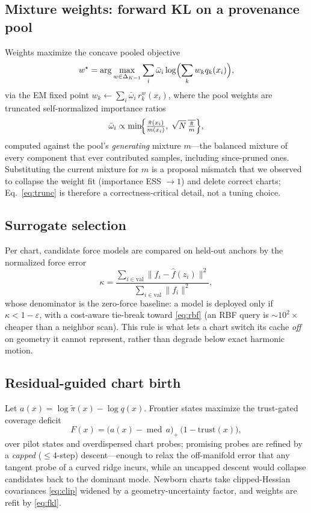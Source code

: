 \documentclass[10pt,journal,compsoc]{IEEEtran}
\begin{document}
\subsection{Mixture weights: forward KL on a provenance pool}
Weights maximize the concave pooled objective
\begin{equation}
w^\star=\arg\max_{w\in\Delta_{K-1}}
\sum_i\bar\omega_i\log\Bigl(\sum_k w_k q_k(x_i)\Bigr),
\label{eq:fkl}
\end{equation}
via the EM fixed point
$w_k\!\leftarrow\!\sum_i\bar\omega_i\,r_k^{w}(x_i)$, where the pool weights
are truncated self-normalized importance ratios \cite{ionides2008}
\begin{equation}
\bar\omega_i\propto
\min\!\Bigl\{\tfrac{\tilde\pi(x_i)}{m(x_i)},\;
\sqrt N\,\overline{\tfrac{\tilde\pi}{m}}\Bigr\},
\label{eq:trunc}
\end{equation}
computed against the pool's \emph{generating} mixture $m$---the balanced
mixture of every component that ever contributed samples, including
since-pruned ones. Substituting the current mixture for $m$ is a proposal
mismatch that we observed to collapse the weight fit (importance ESS
$\to1$) and delete correct charts; Eq.~\eqref{eq:trunc} is therefore a
correctness-critical detail, not a tuning choice.

\subsection{Surrogate selection}
Per chart, candidate force models are compared on held-out anchors by the
normalized force error
\begin{equation}
\kappa=\frac{\sum_{i\in\mathrm{val}}\lVert f_i-\hat f(z_i)\rVert^2}
{\sum_{i\in\mathrm{val}}\lVert f_i\rVert^2},
\label{eq:kappa}
\end{equation}
whose denominator is the zero-force baseline: a model is deployed only if
$\kappa<1-\varepsilon$, with a cost-aware tie-break toward \eqref{eq:rbf}
(an RBF query is $\sim\!10^2\times$ cheaper than a neighbor scan). This
rule is what lets a chart switch its cache \emph{off} on geometry it cannot
represent, rather than degrade below exact harmonic motion.

\subsection{Residual-guided chart birth}
Let $a(x)=\log\tilde\pi(x)-\log q(x)$. Frontier states maximize the
trust-gated coverage deficit
\begin{equation}
F(x)=\bigl(a(x)-\operatorname{med}\,a\bigr)_+\,
\bigl(1-\mathrm{trust}(x)\bigr),
\label{eq:birth}
\end{equation}
over pilot states and overdispersed chart probes; promising probes are
refined by a \emph{capped} ($\le\!4$-step) descent---enough to relax the
off-manifold error that any tangent probe of a curved ridge incurs, while
an uncapped descent would collapse candidates back to the dominant mode.
Newborn charts take clipped-Hessian covariances \eqref{eq:clip} widened by
a geometry-uncertainty factor, and weights are refit by \eqref{eq:fkl}.
\end{document}
